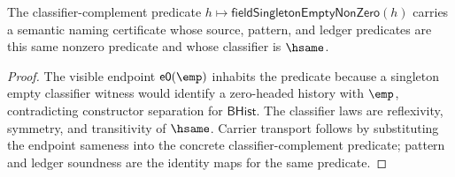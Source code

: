 \begin{theorem}
\label{thm:field-singleton-empty-nonzero-semantic-namecert}
The classifier-complement predicate
$h\mapsto\mathsf{fieldSingletonEmptyNonZero}(h)$ carries a semantic naming
certificate whose source, pattern, and ledger predicates are this same
nonzero predicate and whose classifier is $\hsame$.
\end{theorem}
\begin{proof}
The visible endpoint $\mathsf{e0}(\emp)$ inhabits the predicate because a
singleton empty classifier witness would identify a zero-headed history with
$\emp$, contradicting constructor separation for $\mathsf{BHist}$. The
classifier laws are reflexivity, symmetry, and transitivity of $\hsame$.
Carrier transport follows by substituting the endpoint sameness into the
concrete classifier-complement predicate; pattern and ledger soundness are the
identity maps for the same predicate.
\end{proof}
